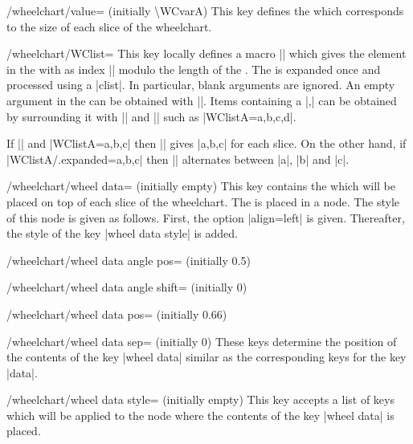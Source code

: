 \documentclass[a4paper,english,dvipsnames]{ltxdoc}
\begin{document}
\begin{key}{/wheelchart/value= (initially \textbackslash WCvarA)}
This key defines the  which corresponds to the size of each slice of the wheelchart.
\end{key}
\begin{key}{/wheelchart/WClist=}
This key locally defines a macro |\WClist| which gives the element in the  with as index |\WCcount| modulo the length of the . The  is expanded once and processed using a |clist|. In particular, blank arguments are ignored. An empty argument in the  can be obtained with |{}|. Items containing a |,| can be obtained by surrounding it with |{| and |}| such as |WClistA={{a,b},{c,d}}|.

If |\def\mylist{a,b,c}| and |WClistA=\mylist| then |\WClistA| gives |a,b,c| for each slice. On the other hand, if |WClistA/.expanded=\mylist| then |\WClistA| alternates between |a|, |b| and |c|.
\end{key}
\begin{key}{/wheelchart/wheel data= (initially \normalfont empty)}
This key contains the  which will be placed on top of each slice of the wheelchart. The  is placed in a node. The style of this node is given as follows. First, the option |align=left| is given. Thereafter, the style of the key |wheel data style| is added.
\end{key}
\begin{key}{/wheelchart/wheel data angle pos= (initially 0.5)}
\end{key}
\begin{key}{/wheelchart/wheel data angle shift= (initially 0)}
\end{key}
\begin{key}{/wheelchart/wheel data pos= (initially 0.66)}
\end{key}
\begin{key}{/wheelchart/wheel data sep= (initially 0)}
These keys determine the position of the contents of the key |wheel data| similar as the corresponding keys for the key |data|.
\end{key}
\begin{stylekey}{/wheelchart/wheel data style= (initially \normalfont empty)}
This key accepts a list of keys which will be applied to the node where the contents of the key |wheel data| is placed.
\end{stylekey}
\end{document}
